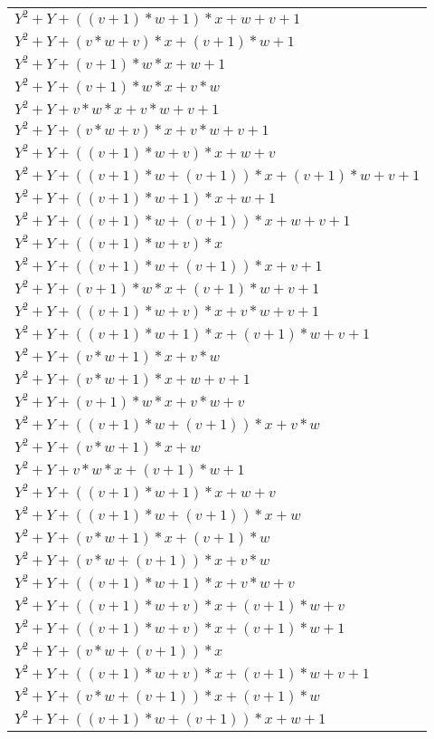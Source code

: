 \documentclass[12pt]{article}
\begin{document}
\begin{adjustwidth}{-2cm}{}
\begin{center}
\begin{longtable}{|l|}
	$Y^2 + Y + ((v + 1)*w + 1)*x + w + v + 1$ \\
	$Y^2 + Y + (v*w + v)*x + (v + 1)*w + 1$ \\
	$Y^2 + Y + (v + 1)*w*x + w + 1$ \\
	$Y^2 + Y + (v + 1)*w*x + v*w$ \\
	$Y^2 + Y + v*w*x + v*w + v + 1$ \\
	$Y^2 + Y + (v*w + v)*x + v*w + v + 1$ \\
	$Y^2 + Y + ((v + 1)*w + v)*x + w + v$ \\
	$Y^2 + Y + ((v + 1)*w + (v + 1))*x + (v + 1)*w + v + 1$ \\
	$Y^2 + Y + ((v + 1)*w + 1)*x + w + 1$ \\
	$Y^2 + Y + ((v + 1)*w + (v + 1))*x + w + v + 1$ \\
	$Y^2 + Y + ((v + 1)*w + v)*x$ \\
	$Y^2 + Y + ((v + 1)*w + (v + 1))*x + v + 1$ \\
	$Y^2 + Y + (v + 1)*w*x + (v + 1)*w + v + 1$ \\
	$Y^2 + Y + ((v + 1)*w + v)*x + v*w + v + 1$ \\
	$Y^2 + Y + ((v + 1)*w + 1)*x + (v + 1)*w + v + 1$ \\
	$Y^2 + Y + (v*w + 1)*x + v*w$ \\
	$Y^2 + Y + (v*w + 1)*x + w + v + 1$ \\
	$Y^2 + Y + (v + 1)*w*x + v*w + v$ \\
	$Y^2 + Y + ((v + 1)*w + (v + 1))*x + v*w$ \\
	$Y^2 + Y + (v*w + 1)*x + w$ \\
	$Y^2 + Y + v*w*x + (v + 1)*w + 1$ \\
	$Y^2 + Y + ((v + 1)*w + 1)*x + w + v$ \\
	$Y^2 + Y + ((v + 1)*w + (v + 1))*x + w$ \\
	$Y^2 + Y + (v*w + 1)*x + (v + 1)*w$ \\
	$Y^2 + Y + (v*w + (v + 1))*x + v*w$ \\
	$Y^2 + Y + ((v + 1)*w + 1)*x + v*w + v$ \\
	$Y^2 + Y + ((v + 1)*w + v)*x + (v + 1)*w + v$ \\
	$Y^2 + Y + ((v + 1)*w + v)*x + (v + 1)*w + 1$ \\
	$Y^2 + Y + (v*w + (v + 1))*x$ \\
	$Y^2 + Y + ((v + 1)*w + v)*x + (v + 1)*w + v + 1$ \\
	$Y^2 + Y + (v*w + (v + 1))*x + (v + 1)*w$ \\
	$Y^2 + Y + ((v + 1)*w + (v + 1))*x + w + 1$ \\

\end{longtable}
\end{center}
\end{adjustwidth}
\end{document}
